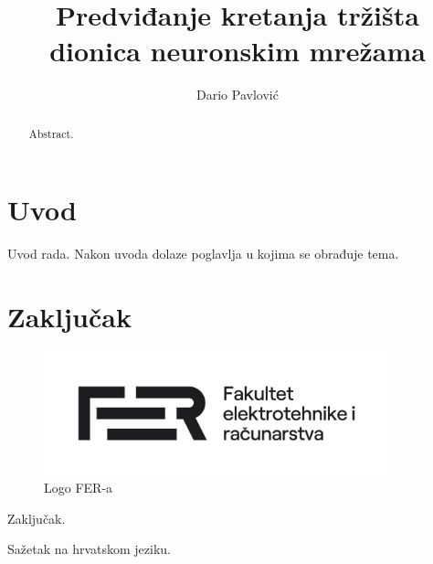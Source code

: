 \documentclass[times, utf8, zavrsni]{fer}
\begin{document}

\title{Predviđanje kretanja tržišta dionica neuronskim mrežama}

\author{Dario Pavlović}

\maketitle



\zahvala{}

\tableofcontents

\chapter{Uvod}
Uvod rada. Nakon uvoda dolaze poglavlja u kojima se obrađuje tema.

\chapter{Zaključak}

\begin{figure}[htb]
\centering
\includegraphics[width=10cm]{img/FER_logo.jpg}
\caption{Logo FER-a}
\label{fig:fer-logo}
\end{figure}

Zaključak.





\begin{sazetak}
Sažetak na hrvatskom jeziku.

\end{sazetak}

\begin{abstract}
Abstract.

\end{abstract}
\end{document}
